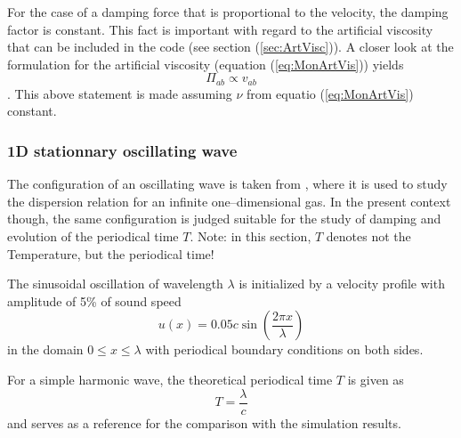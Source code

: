 \documentclass{report}
\begin{document}
For the case of a damping force that is proportional to the velocity, the damping factor
is constant. This fact is important with regard to the artificial viscosity that can be included in the code (see section (\ref{sec:ArtVisc})). A closer look at the formulation for the artificial viscosity (equation (\ref{eq:MonArtVis})) yields
\begin{equation}
 \Pi_{ab}\propto v_{ab}
\end{equation}.
This above statement is made assuming $\nu$ from equatio (\ref{eq:MonArtVis}) constant.




\subsubsection{1D stationnary oscillating wave}
The configuration of an oscillating wave is taken from \cite{Monaghan2005}, where it is used
to study the dispersion relation for an infinite one--dimensional gas. In the present context though, the same configuration is judged suitable for the study of damping and evolution of the periodical time $T$.
Note: in this section, $T$ denotes not the Temperature, but the periodical time! 

The sinusoidal oscillation of wavelength $\lambda$ is initialized by a velocity profile with amplitude of 5\% of sound speed
\begin{equation}
 u(x)=0.05 c\sin\left(\frac{2\pi x}{\lambda}\right)
\end{equation}
in the domain $0\leq x\leq \lambda$ with periodical boundary conditions on both sides.

For a simple harmonic wave, the theoretical periodical time $T$ is given as \cite{Stewart1930}
\begin{equation}
 T=\frac{\lambda}{c}
\end{equation}
and serves as a reference for the comparison with the simulation results.
\end{document}
